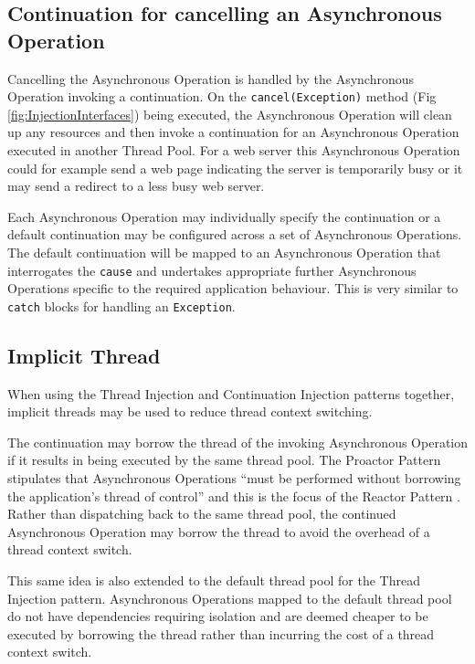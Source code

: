 \documentclass[prodmode]{style/acmlarge}
\begin{document}
\subsection{Continuation for cancelling an Asynchronous Operation}

Cancelling the Asynchronous Operation is handled by the Asynchronous Operation
invoking a continuation.  On the \texttt{cancel(Exception)} method (Fig
\ref{fig:InjectionInterfaces}) being executed, the Asynchronous Operation will
clean up any resources and then invoke a continuation for an Asynchronous
Operation executed in another Thread Pool.  For a web server this Asynchronous
Operation could for example send a web page indicating the server is temporarily
busy or it may send a redirect to a less busy web server.

Each Asynchronous Operation may individually specify the continuation or a
default continuation may be configured across a set of Asynchronous Operations.
The default continuation will be mapped to an Asynchronous Operation that
interrogates the \texttt{cause} and undertakes appropriate further Asynchronous
Operations specific to the required application behaviour.  This is very similar
to \texttt{catch} blocks for handling an \texttt{Exception}.


\subsection{Implicit Thread}

When using the Thread Injection and Continuation Injection patterns together,
implicit threads may be used to reduce thread context switching.

The continuation may borrow the thread of the invoking Asynchronous Operation if
it results in being executed by the same thread pool.  The Proactor Pattern
stipulates that Asynchronous Operations ``must be performed without borrowing
the application's thread of control'' \cite[p. 8]{proactor} and this is the
focus of the Reactor Pattern \cite{reactor}.  Rather than dispatching back to
the same thread pool, the continued Asynchronous Operation may borrow the thread
to avoid the overhead of a thread context switch.

This same idea is also extended to the default thread pool for the Thread
Injection pattern.  Asynchronous Operations mapped to the default thread pool do
not have dependencies requiring isolation and are deemed cheaper to be executed
by borrowing the thread rather than incurring the cost of a thread context
switch.
\end{document}
